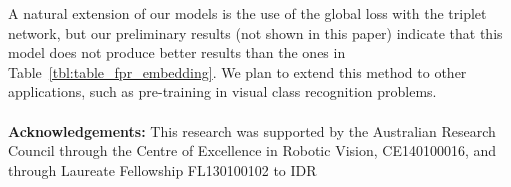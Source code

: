 \documentclass[10pt,twocolumn,letterpaper]{article}
\begin{document}
A natural extension of our models is the use of the global loss with the triplet network, but our preliminary results (not shown in this paper)  indicate that this model does not produce better results than the ones in Table~\ref{tbl:table_fpr_embedding}.
We plan to extend this method to other applications, such as pre-training in visual class recognition problems.
\\\\
\textbf{Acknowledgements:} This research was supported by the Australian Research Council through the Centre of Excellence in Robotic Vision, CE140100016, and through Laureate Fellowship FL130100102 to IDR
{\small


}
\end{document}
